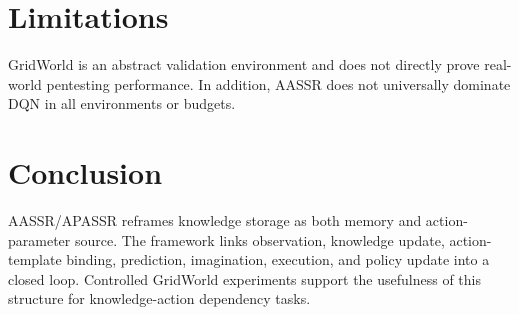 \documentclass[conference]{IEEEtran}
\begin{document}
\section{Limitations}

GridWorld is an abstract validation environment and does not directly prove
real-world pentesting performance. In addition, AASSR does not universally
dominate DQN in all environments or budgets.

\section{Conclusion}

AASSR/APASSR reframes knowledge storage as both memory and action-parameter
source. The framework links observation, knowledge update, action-template
binding, prediction, imagination, execution, and policy update into a closed
loop. Controlled GridWorld experiments support the usefulness of this structure
for knowledge-action dependency tasks.
\end{document}
